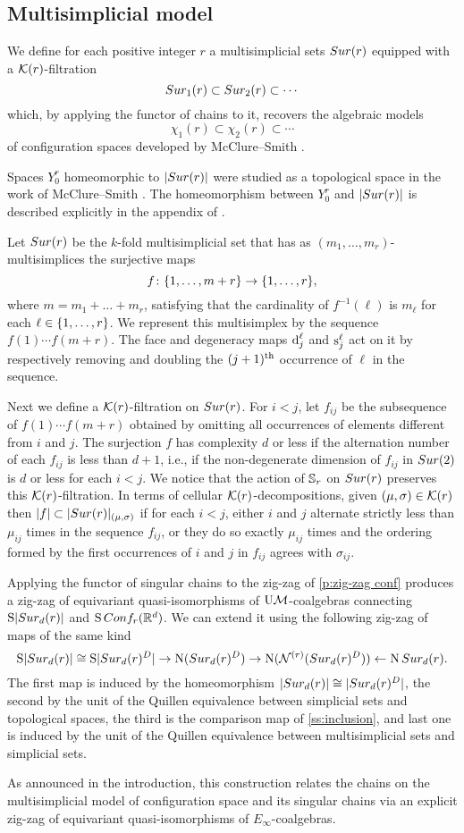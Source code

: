 
\subsection{Multisimplicial model}\label{ss:surjection model}

We define for each positive integer $r$ a multisimplicial sets $Sur(r)$ equipped with a $\mathcal{K}(r)$-filtration
\[
Sur_{1}(r) \subset Sur_{2}(r) \subset \dotsb
\]
which, by applying the functor of chains to it, recovers the algebraic models
\[
\chi_1(r) \subset \chi_2(r) \subset \dotsb
\]
of configuration spaces developed by McClure--Smith \cite{mcluresmith2004geomodel}.

Spaces $Y_0^r$ homeomorphic to $\lvert Sur(r)\rvert$ were studied as a topological space in the work of McClure--Smith \cite{mcclure2003multivariable}.
The homeomorphism between $Y_0^r$ and $\lvert Sur(r)\rvert$ is described explicitly in the appendix of \cite{salvatore2009deligne}.

Let $Sur(r)$ be the $k$-fold multisimplicial set that has as $(m_1,\dots,m_r)$-multisimplices the surjective maps
\[
f \colon \{1,\dots,m+r\} \to \{1,\dots,r\},
\]
where $m = m_1+\dots+m_r$, satisfying that the cardinality of $f^{-1}(\ell)$ is $m_\ell$ for each $\ell \in \{1,\dots,r\}$.
We represent this multisimplex by the sequence $f(1) \dotsm f(m+r)$.
The face and degeneracy maps $\operatorname{d}^\ell_j$ and $\operatorname{s}^\ell_j$ act on it by respectively removing and doubling the $(j+1)^{\mathrm{th}}$ occurrence of $\ell$ in the sequence.

Next we define a $\mathcal{K}(r)$-filtration on $Sur(r)$.
For $i<j$, let $f_{ij}$ be the subsequence of $f(1) \dotsm f(m+r)$ obtained by omitting all occurrences of elements different from $i$ and $j$.
The surjection $f$ has complexity $d$ or less if the alternation number of each $f_{ij}$ is less than $d+1$, i.e., if the non-degenerate dimension of $f_{ij}$ in $Sur(2)$ is $d$ or less for each $i<j$.
We notice that the action of $\mathbb{S}_r$ on $Sur(r)$ preserves this $\mathcal{K}(r)$-filtration.
In terms of cellular $\mathcal{K}(r)$-decompositions, given $(\mu,\sigma) \in \mathcal{K}(r)$ then $\lvert f\rvert \subset \lvert Sur(r)\rvert_{(\mu,\sigma)}$ if for each $i<j$, either $i$ and $j$ alternate strictly less than $\mu_{ij}$ times in the sequence $f_{ij}$, or they do so exactly $\mu_{ij}$ times and the ordering formed by the first occurrences of $i$ and $j$ in $f_{ij}$ agrees with $\sigma_{ij}$.

Applying the functor of singular chains to the zig-zag of \cref{p:zig-zag conf} produces a zig-zag of equivariant quasi-isomorphisms of $\mathrm{U}\mathcal{M}$-coalgebras connecting $\operatorname{S}\lvert Sur_d(r)\rvert$ and $\operatorname{S}Conf_{r}(\mathbb{R}^{d})$.
We can extend it using the following zig-zag of maps of the same kind
\[
\operatorname{S}\lvert Sur_{d}(r)\rvert \cong
\operatorname{S}\lvert Sur_{d}(r)^{D}\rvert \to
\operatorname{N}(Sur_{d}(r)^D) \to
\operatorname{N}(\mathcal{N}^{(r)}(Sur_{d}(r)^D)) \leftarrow
\operatorname{N}Sur_{d}(r).
\]
The first map is induced by the homeomorphism $\lvert Sur_{d}(r)\rvert \cong \lvert Sur_{d}(r)^{D}\rvert$, the second by the unit of the Quillen equivalence between simplicial sets and topological spaces, the third is the comparison map of \cref{ss:inclusion}, and last one is induced by the unit of the Quillen equivalence between multisimplicial sets and simplicial sets.

As announced in the introduction, this construction relates the chains on the multisimplicial model of configuration space and its singular chains via an explicit zig-zag of equivariant quasi-isomorphisms of $E_\infty$-coalgebras.